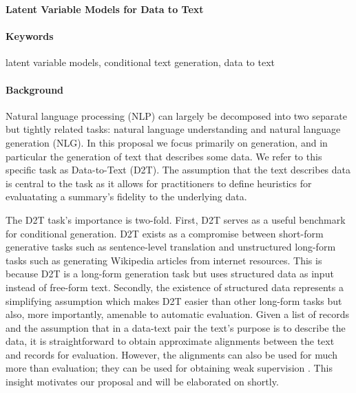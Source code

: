\documentclass[11pt]{article}
\begin{document}

\begin{center}
\textbf{Latent Variable Models for Data to Text}
\end{center}

\paragraph{Keywords}
latent variable models, conditional text generation, data to text

\paragraph{Background}
Natural language processing (NLP) can largely be decomposed into two separate but
tightly related tasks: natural language understanding and natural language generation (NLG).
In this proposal we focus primarily on generation, and in particular
the generation of text that describes some data.
We refer to this specific task as Data-to-Text (D2T).
The assumption that the text describes data is central to the task as it allows for practitioners to 
define heuristics for evaluatating a summary's fidelity to the underlying data.

The D2T task's importance is two-fold.
First, D2T serves as a useful benchmark for conditional generation.
D2T exists as a compromise between short-form generative tasks such as sentence-level translation
and unstructured long-form tasks such as generating Wikipedia articles from internet resources.
This is because D2T is a long-form generation task but uses structured data as input instead of free-form text.
Secondly, the existence of structured data represents a simplifying assumption which makes D2T easier than other
long-form tasks but also, more importantly, amenable to automatic evaluation.
Given a list of records and the assumption that in a data-text pair the text's purpose is to describe the data,
it is straightforward to obtain approximate alignments between the text and records for evaluation.
However, the alignments can also be used for much more than evaluation; they can be used for obtaining weak supervision
\citep{puduppully2018contentselection}. %
This insight motivates our proposal and will be elaborated on shortly.
\end{document}
